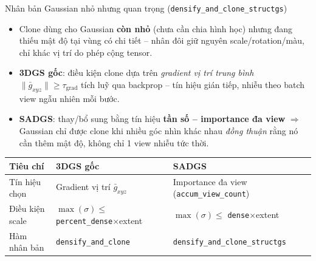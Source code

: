 
\begin{frame}{Nhân bản Gaussian nhỏ nhưng quan trọng (\texttt{densify\_and\_clone\_structgs})}
\footnotesize
\begin{itemize}
    \item Clone dùng cho Gaussian \textbf{còn nhỏ} (chưa cần chia hình học) nhưng đang thiếu mật độ tại vùng có chi tiết -- nhân đôi giữ nguyên scale/rotation/màu, chỉ khác vị trí do phép cộng tensor.
    \item \textbf{3DGS gốc}: điều kiện clone dựa trên \textit{gradient vị trí trung bình} $\lVert\bar g_{xyz}\rVert \ge \tau_{\text{grad}}$ tích luỹ qua backprop -- tín hiệu gián tiếp, nhiễu theo batch view ngẫu nhiên mỗi bước.
    \item \textbf{SADGS}: thay/bổ sung bằng tín hiệu \textbf{tần số -- importance đa view} $\Rightarrow$ Gaussian chỉ được clone khi nhiều góc nhìn khác nhau \textit{đồng thuận} rằng nó cần thêm mật độ, không chỉ 1 view nhiễu tức thời.
\end{itemize}
\vspace{0.2cm}
\small
\centering
\begin{tabular}{lll}
\toprule
\textbf{Tiêu chí} & \textbf{3DGS gốc} & \textbf{SADGS} \\
\midrule
Tín hiệu chọn & Gradient vị trí $\bar g_{xyz}$ & Importance đa view (\texttt{accum\_view\_count}) \\
Điều kiện scale & $\max(\sigma) \le$ \texttt{percent\_dense}$\times$extent & $\max(\sigma) \le$ \texttt{dense}$\times$extent \\
Hàm nhân bản & \texttt{densify\_and\_clone} & \texttt{densify\_and\_clone\_structgs} \\
\bottomrule
\end{tabular}
\end{frame}

